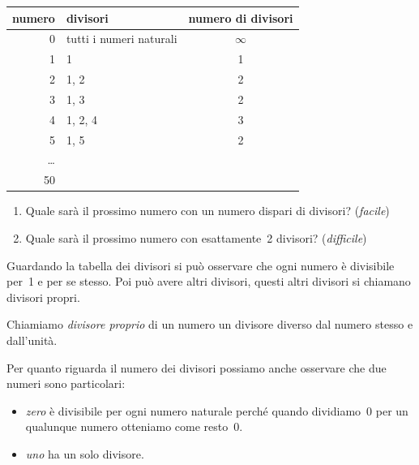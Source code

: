 \begin{table}[h]
\centering
\begin{tabular}{|r|p{6cm}|c|}
\hline
\textsf{\relax 
numero
} & \textsf{\relax 
          divisori 
} & \textsf{\relax 
numero di divisori
}\\
\hline
0 & tutti i numeri naturali & \(\infty\)\\
\hline
1 & 1 & 1\\
\hline
2 & 1, 2 & 2\\
\hline
3 & 1, 3 & 2\\
\hline
4 & 1, 2, 4 & 3\\
\hline
5 & 1, 5 & 2\\
\hline
\dots &  & \\
\hline
50 &  & \\
\hline
\end{tabular}
\end{table}

\begin{enumerate}[noitemsep, label=(\alph*)]
 \item Quale sarà il prossimo numero con un numero dispari 
  di divisori? (\emph{facile})
 \item Quale sarà il prossimo numero con esattamente~2
  divisori? (\emph{difficile})
\end{enumerate}

Guardando la tabella dei divisori si può osservare che ogni numero è 
divisibile per~1 e per se stesso. Poi può avere altri divisori, questi
altri divisori si chiamano divisori propri.

\begin{definizione}
 Chiamiamo \emph{divisore proprio} di un numero un divisore diverso dal 
 numero stesso e dall'unità.
\end{definizione}

Per quanto riguarda il numero dei divisori possiamo anche osservare che 
due numeri sono particolari:

\begin{itemize} [nosep]
 \item \emph{zero} è divisibile per ogni numero naturale perché quando 
  dividiamo~0 per un qualunque numero otteniamo come resto~0.
 \item \emph{uno} ha un solo divisore.
\end{itemize}

